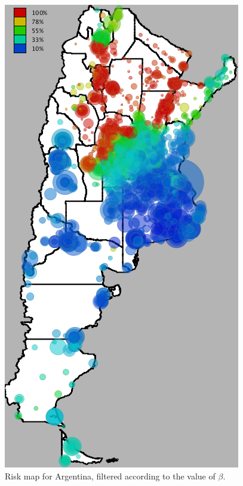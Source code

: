 \begin{figure}[ht]
	\caption{Risk map for Argentina, filtered according to the value of $\beta$.}\label{fig:mapa_argentina}
	\begin{minipage}{.495\linewidth}
		\centering
		\includegraphics[width=0.90\linewidth]
		{figures/201112_hi_res_argentina_usuarios_proporcion_circulos_beta1/201112_hi_res_argentina_usuarios_proporcion_circulos_beta1}


\end{minipage}
\end{figure}
